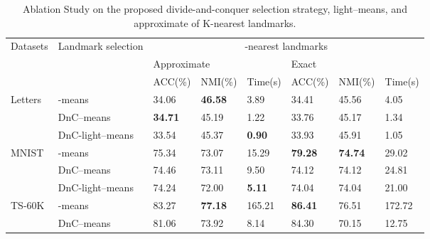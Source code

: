 \begin{table*}[]
  \centering
  \caption{Ablation Study on the proposed divide-and-conquer selection strategy, light--means, and approximate of K-nearest landmarks.}
  \label{tab:ablation}
  \begin{tabular}{@{}llllllll@{}}
    \toprule

    \multirow{3}{*}{Datasets} & \multirow{3}{*}{Landmark selection} & \multicolumn{6}{c}{-nearest landmarks}                                  \\ \cmidrule(l){3-8}
    &                                     & \multicolumn{3}{l|}{Approximate}                 & \multicolumn{3}{l}{Exact}   \\ \cmidrule(l){3-8}
                                &                     & ACC(\%)        & NMI(\%)          & \multicolumn{1}{l|}{Time(s)}         & ACC(\%)          & NMI(\%)          & Time(s)   \\ \midrule
    \multirow{3}{*}{Letters}    & -means           & {34.06}        & {\textbf{46.58}} & \multicolumn{1}{l|}{{3.89}}          & 34.41            & 45.56            & 4.05      \\
                                & DnC--means       & \textbf{34.71} & 45.19            & \multicolumn{1}{l|}{1.22}            & 33.76            & 45.17            & 1.34      \\
                                & DnC-light--means & {33.54}        & {45.37}          & \multicolumn{1}{l|}{{\textbf{0.90}}} & {33.93}          & {45.91}          & {1.05}    \\
    \midrule
    \multirow{3}{*}{MNIST}      & -means           & {75.34}        & {73.07}          & \multicolumn{1}{l|}{{15.29}}         & \textbf{79.28}   & \textbf{74.74}   & 29.02     \\
                                & DnC--means       & 74.46          & 73.11            & \multicolumn{1}{l|}{9.50}            & 74.12            & 74.12            & 24.81     \\
                                & DnC-light--means & {74.24}        & {72.00}          & \multicolumn{1}{l|}{{\textbf{5.11}}} & {74.04}          & {74.04}          & {21.00}   \\
    \midrule
    \multirow{3}{*}{TS-60K}     & -means           & {83.27}        & {\textbf{77.18}} & \multicolumn{1}{l|}{{165.21}}        & \textbf{86.41}   & 76.51            & 172.72    \\
                                & DnC--means       & 81.06          & 73.92            & \multicolumn{1}{l|}{8.14}            & 84.30            & 70.15            & 12.75     \\

\end{tabular}
\end{table*}
